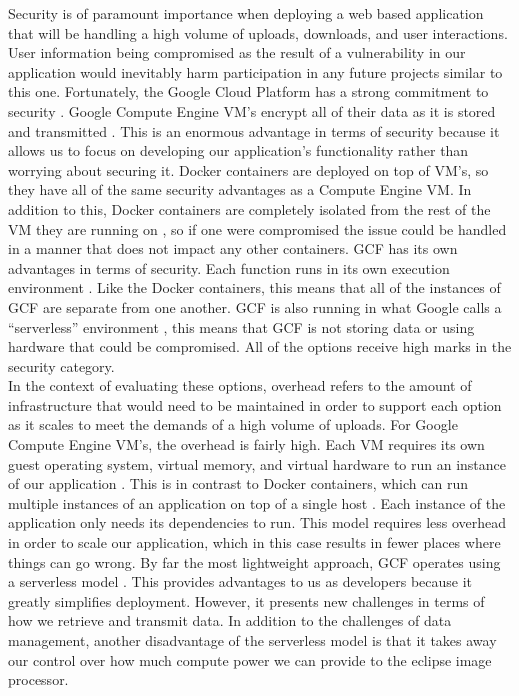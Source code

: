 \documentclass[10pt, onecolumn, draftclsnofoot, letterpaper, compsoc]{IEEEtran}
\begin{document}
Security is of paramount importance when deploying a web based application that
will be handling a high volume of uploads, downloads, and user interactions.
User information being compromised as the result of a vulnerability in our
application would inevitably harm participation in any future projects similar
to this one. Fortunately, the Google Cloud Platform has a strong commitment to
security \cite{gcp}. Google Compute Engine VM's encrypt all of their data as it
is stored and transmitted \cite{gcp}. This is an enormous advantage in terms of
security because it allows us to focus on developing our application's
functionality rather than worrying about securing it. Docker containers are
deployed on top of VM's, so they have all of the same security advantages as a
Compute Engine VM. In addition to this, Docker containers are completely
isolated from the rest of the VM they are running on \cite{docker}, so if one
were compromised the issue could be handled in a manner that does not impact any
other containers. GCF has its own advantages in terms of security. Each function
runs in its own execution environment \cite{docker}. Like the Docker containers,
this means that all of the instances of GCF are separate from one another. GCF
is also running in what Google calls a ``serverless” environment \cite{docker},
this means that GCF is not storing data or using hardware that could be
compromised. All of the options receive high marks in the security category. \\

In the context of evaluating these options, overhead refers to the amount of
infrastructure that would need to be maintained in order to support each option
as it scales to meet the demands of a high volume of uploads. For Google Compute
Engine VM’s, the overhead is fairly high. Each VM requires its own guest
operating system, virtual memory, and virtual hardware to run an instance of our
application \cite{docker, gcf}. This is in contrast to Docker containers, which
can run multiple instances of an application on top of a single host
\cite{docker}. Each instance of the application only needs its dependencies to
run. This model requires less overhead in order to scale our application, which
in this case results in fewer places where things can go wrong. By far the most
lightweight approach, GCF operates using a serverless model \cite{gcp}. This
provides advantages to us as developers because it greatly simplifies
deployment. However, it presents new challenges in terms of how we retrieve and
transmit data. In addition to the challenges of data management, another
disadvantage of the serverless model is that it takes away our control over how
much compute power we can provide to the eclipse image processor. \\
\end{document}
